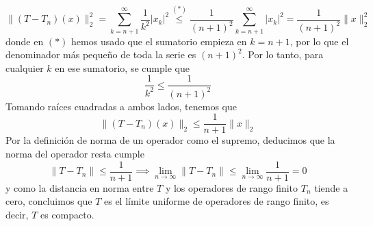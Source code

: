 \begin{ejercicio}
    $$\|(T - T_n)(x)\|_2^2 = \sum_{k=n+1}^{\infty} \frac{1}{k^2} |x_k|^2 \overset{(*)}{\le}\frac{1}{(n+1)^2} \sum_{k=n+1}^{\infty} |x_k|^2=\frac{1}{(n+1)^2} \|x\|_2^2$$
    donde en $(*)$ hemos usado que el sumatorio empieza en $k = n+1$, por lo que el denominador más pequeño de toda la serie es $(n+1)^2$. Por lo tanto, para cualquier $k$ en ese sumatorio, se cumple que 
    $$\frac{1}{k^2} \le \frac{1}{(n+1)^2}$$
    Tomando raíces cuadradas a ambos lados, tenemos que
    $$\|(T - T_n)(x)\|_2 \le \frac{1}{n+1} \|x\|_2$$
    Por la definición de norma de un operador como el supremo, deducimos que la norma del operador resta cumple
    $$\|T - T_n\| \le \frac{1}{n+1}\implies \lim_{n \to \infty} \|T - T_n\| \le \lim_{n \to \infty} \frac{1}{n+1} = 0$$
    y como la distancia en norma entre $T$ y los operadores de rango finito $T_n$ tiende a cero, concluimos que $T$ es el límite uniforme de operadores de rango finito, es decir, $T$ es compacto.
    
\end{ejercicio}

